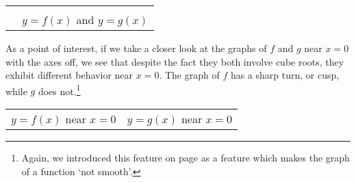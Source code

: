 \documentclass[12pt]{ximera}
\begin{document}
\begin{example}
\begin{enumerate}
\begin{center}

\begin{tabular}{m{2.5in}c}













&

 \\ 

& $y = f(x)$ and \boldmath $y = g(x)$ \\

\end{tabular}

\end{center}

As a point of interest, if we take a closer look at the graphs of $f$ and $g$  near $x=0$ with the axes off, we see that despite the fact they both involve cube roots, they exhibit different behavior near $x=0$.  The graph of $f$ has a sharp turn, or cusp, while $g$ does not.\footnote{Again, we introduced this feature on page \pageref{cusppicture} as a feature which makes the graph of a function `not smooth'.}

\begin{center}

\begin{tabular}{cc}

 \\ 

$y=f(x)$ near $x=0$ & $y=g(x)$ near $x=0$ \\


\end{tabular}
\end{center}
\end{enumerate}
\end{example}
\end{document}
